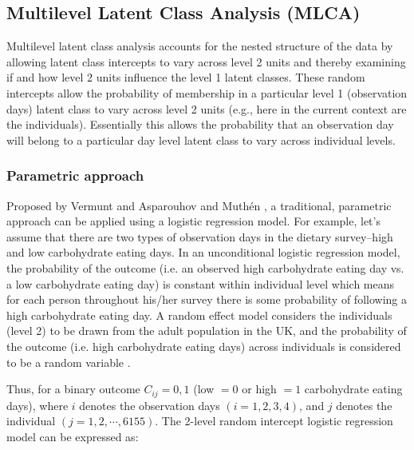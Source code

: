 
\subsection{Multilevel Latent Class Analysis (MLCA)}\vspace{-0.3cm}


Multilevel latent class analysis accounts for the nested structure of the data by allowing latent class intercepts to vary across level 2 units and thereby examining if and how level 2 units influence the level 1 latent classes. These random intercepts allow the probability of membership in a particular level 1 (observation days) latent class to vary across level 2 units (e.g., here in the current context are the individuals). Essentially this allows the probability that an observation day will belong to a
particular day level latent class to vary across individual levels.\vspace{-0.5cm}

\subsubsection{Parametric approach}\vspace{-0.3cm}

Proposed by Vermunt \parencite{Vermunt, vermunt2008latent} and Asparouhov and Muth\'en \parencite{muthen2009multilevel},  a traditional, parametric approach can be applied using a logistic regression model. For example, let's assume that there are two types of observation days in the dietary survey--high and low carbohydrate eating days. In an unconditional logistic regression model, the probability of the outcome (i.e. an observed high carbohydrate eating day vs. a low carbohydrate eating day) is constant within individual level which means for each person throughout his/her survey there is some probability of following a high carbohydrate eating day. A random effect model considers the individuals (level 2) to be drawn from the adult population in the UK, and the probability of the outcome (i.e. high carbohydrate eating days) across individuals is considered to be a random variable \parencite{snijders2011multilevel}. 

Thus, for a binary outcome $C_{ij} = 0, 1$ (low $=0$ or high $=1$ carbohydrate eating days), where $i$ denotes the observation days $(i = 1, 2, 3, 4)$, and $j$ denotes the individual $(j = 1, 2, \cdots, 6155)$. The 2-level random intercept logistic regression model can be expressed as:\vspace{-0.4cm}


